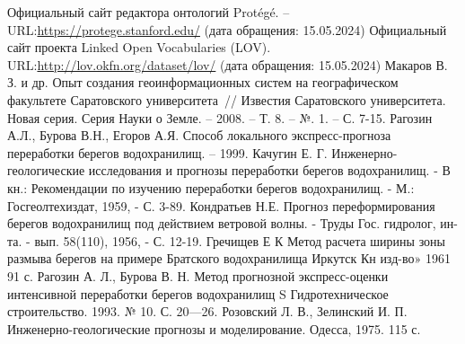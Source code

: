 \documentclass[732,fontsize=14pt,final]{studrep}
\begin{document}
\begin{thebibliography}{99}
 Официальный сайт редактора онтологий Protégé. -- URL:\url{https://protege.stanford.edu/} (дата обращения: 15.05.2024)
 Официальный сайт проекта Linked Open Vocabularies (LOV). URL:\url{http://lov.okfn.org/dataset/lov/} (дата обращения: 15.05.2024)
 Макаров В. З. и др. Опыт создания геоинформационных систем на географическом факультете Саратовского университета~// Известия Саратовского университета. Новая серия. Серия Науки о Земле. – 2008. – Т. 8. – №. 1. – С. 7-15.
Рагозин А.Л., Бурова В.Н., Егоров А.Я. Способ локального экспресс-прогноза переработки берегов водохранилищ. – 1999.
Качугин Е. Г. Инженерно-геологические исследования и прогнозы переработки берегов водохранилищ. - В кн.: Рекомендации по изучению переработки берегов водохранилищ. - М.: Госгеолтехиздат, 1959, - С. 3-89.
Кондратьев Н.Е. Прогноз переформирования берегов водохранилищ под действием ветровой волны. - Труды Гос. гидролог, ин-та. - вып. 58(110), 1956, - С. 12-19.
Гречищев Е К Метод расчета ширины зоны размыва берегов на примере Братского водохранилища Иркутск Кн изд-во» 1961 91 с.
Рагозин А. Л., Бурова В. Н. Метод прогнозной экспресс-оценки интенсивной переработки берегов водохранилищ S Гидротехническое строительство. 1993. № 10. С. 20—26.
Розовский Л. В., Зелинский И. П. Инженерно-геологические прогнозы и моде­лирование. Одесса, 1975. 115 с.
\end{thebibliography}
\appendix
\end{document}
